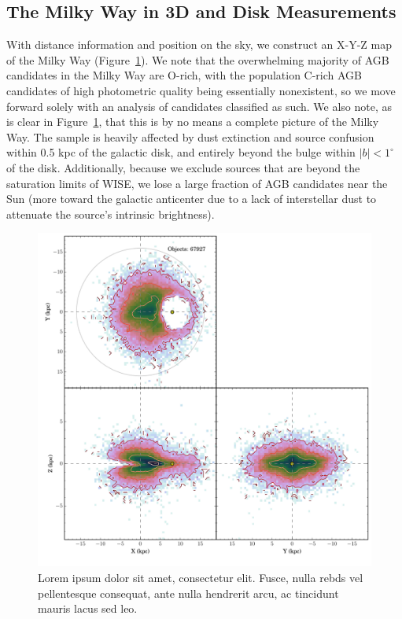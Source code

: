 \subsection{The Milky Way in 3D and Disk Measurements}
With distance information and position on the sky, we construct an X-Y-Z map of the Milky Way (Figure~\ref{fig:xyz_candidates}). We note that the overwhelming majority of AGB candidates in the Milky Way are O-rich, with the population C-rich AGB candidates of high photometric quality being essentially nonexistent, so we move forward solely with an analysis of candidates classified as such. We also note, as is clear in Figure~\ref{fig:xyz_candidates}, that this is by no means a complete picture of the Milky Way. The sample is heavily affected by dust extinction and source confusion within 0.5 kpc of the galactic disk, and entirely beyond the bulge within $|b| < 1^\circ$ of the disk. Additionally, because we exclude sources that are beyond the saturation limits of WISE, we lose a large fraction of AGB candidates near the Sun (more toward the galactic anticenter due to a lack of interstellar dust to attenuate the source's intrinsic brightness).

\begin{figure}[h]
\centering
\includegraphics[width=5in]{figs/orich_candidates_xyz.pdf}
\caption{Lorem ipsum dolor sit amet, consectetur elit. Fusce, nulla rebds vel pellentesque consequat, ante nulla hendrerit arcu, ac tincidunt mauris lacus sed leo.}
\label{fig:xyz_candidates}
\end{figure}

